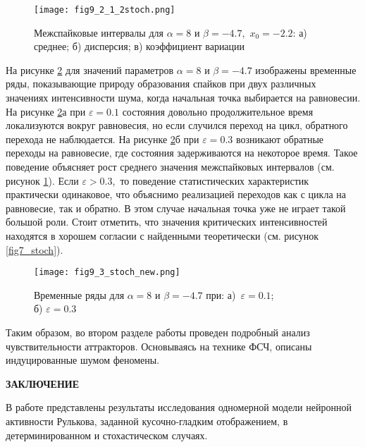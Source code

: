 \documentclass[a4paper, 14pt]{extreport}
\numberwithin{equation}{section}
\numberwithin{figure}{section}
\numberwithin{table}{section}
\newcommand{\empline}{\mbox{}\newline}
\newcommand{\likechapterheading}[1]{
    \begin{center}
    \textbf{\MakeUppercase{#1}}
    \end{center}
    \empline}
\newcommand{\likechapter}[1]{
    \likechapterheading{#1}
    \addcontentsline{toc}{likechapter}{\MakeUppercase{#1}}}
\begin{document}
                \begin{figure}[h!]
					\begin{center}
						\texttt{[image: fig9\_2\_1\_2stoch.png]}
					\end{center}
					\caption{Межспайковые интервалы для $ \alpha = 8$ и $ \beta = -4.7$,~$ x_{0} = -2.2 $: а) среднее; б) дисперсия; в) коэффициент вариации}
					\label{fig9_2_1_stoch}		
				\end{figure}

				\newpage
				На рисунке \ref{fig9_3_stoch} для значений параметров $ \alpha = 8 $ и $ \beta = -4.7 $ изображены временные ряды, показывающие природу образования спайков при двух различных значениях интенсивности шума, когда начальная точка выбирается на равновесии. На рисунке \ref{fig9_3_stoch}а при $ \varepsilon = 0.1 $ состояния довольно продолжительное время локализуются вокруг равновесия, но если случился переход на цикл, обратного перехода не наблюдается. На рисунке \ref{fig9_3_stoch}б при $ \varepsilon = 0.3 $ возникают обратные переходы на равновесие, где состояния задерживаются на некоторое время. Такое поведение объясняет рост среднего значения межспайковых интервалов (см. рисунок \ref{fig9_2_1_stoch}). Если $ \varepsilon > 0.3 $,~то поведение статистических характеристик практически одинаковое, что объяснимо реализацией переходов как с цикла на равновесие, так и обратно. В этом случае начальная точка уже не играет такой большой роли. Стоит отметить, что значения критических интенсивностей находятся в хорошем согласии с найденными теоретически (см. рисунок \ref{fig7_stoch}).
				
                \begin{figure}[H]
					\begin{center}
						\texttt{[image: fig9\_3\_stoch\_new.png]}
					\end{center}
					\caption{Временные ряды для $ \alpha = 8 $ и $ \beta = -4.7$ при: а)~$ \varepsilon = 0.1 $; \\ б) $ \varepsilon = 0.3 $}
					\label{fig9_3_stoch}		
				\end{figure} %

                Таким образом, во втором разделе работы проведен подробный анализ чувствительности аттракторов. Основываясь на технике ФСЧ, описаны индуцированные шумом феномены.

\newpage
\likechapter{Заключение}

В работе представлены результаты исследования одномерной модели нейронной активности Рулькова, заданной кусочно-гладким отображением, в детерминированном и стохастическом случаях.
\end{document}

